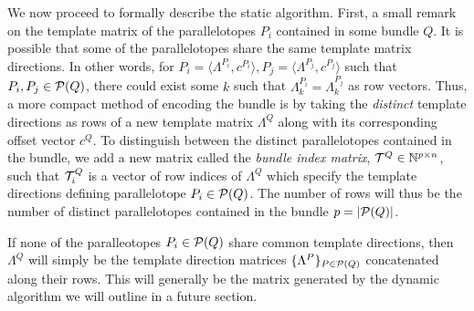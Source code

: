 We now proceed to formally describe the static algorithm.
%
First, a small remark on the template matrix of the parallelotopes $P_i$ contained in some bundle $Q$. It is possible that some of the parallelotopes share the same template matrix directions.
%
 In other words, for $P_i = \langle \Lambda^{P_i}, c^{P_i} \rangle, P_j = \langle \Lambda^{P_j}, c^{P_j} \rangle$ such that $P_i, P_j \in \mathcal{P}(Q)$, there could exist some $k$ such that $\Lambda^{P_i}_k = \Lambda^{P_j}_k$ as row vectors.
%
Thus, a more compact method of encoding the bundle is by taking the \emph{distinct} template directions as rows of a new template matrix $\Lambda^Q$ along with its corresponding offset vector $c^Q$.
%
To distinguish between the distinct parallelotopes contained in the bundle, we add a new matrix called the \emph{bundle index matrix}, $\mathcal{T}^Q \in \mathbb{N}^{p \times n}$, such that $\mathcal{T}^Q_i$ is a vector of row indices of $\Lambda^Q$ which specify the template directions defining parallelotope $P_i \in \mathcal{P}(Q)$.
%
The number of rows will thus be the number of distinct parallelotopes contained in the bundle $p = |\mathcal{P}(Q)|$.
%
\begin{remark}
If none of the paralleotopes $P_i \in \mathcal{P}(Q)$ share common template directions, then $\Lambda^Q$ will simply be the template direction matrices $\{\Lambda^P\}_{P \in \mathcal{P}(Q)}$ concatenated along their rows. This will generally be the matrix generated by the dynamic algorithm we will outline in a future section.
\end{remark}
%
